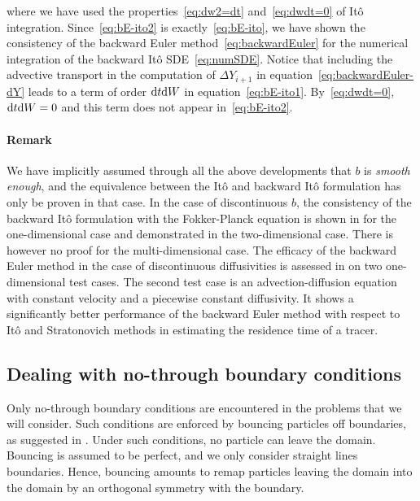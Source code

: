 where we have used the properties~\eqref{eq:dw2=dt} and~\eqref{eq:dwdt=0} of Itô integration. Since~\eqref{eq:bE-ito2} is exactly~\eqref{eq:bE-ito}, we have shown the consistency of the backward Euler method~\eqref{eq:backwardEuler} for the numerical integration of the backward Itô SDE~\eqref{eq:numSDE}. Notice that including the advective transport in the computation of $\Delta Y_{i+1}$ in equation~\eqref{eq:backwardEuler-dY} leads to a term of order $\rm dt \rm dW$ in equation~\eqref{eq:bE-ito1}. By~\eqref{eq:dwdt=0}, $\rm dt \rm dW = 0$ and this term does not appear in~\eqref{eq:bE-ito2}. 

\paragraph{Remark} We have implicitly assumed through all the above developments that $b$ is \textit{smooth enough}, and the equivalence between the Itô and backward Itô formulation has only be proven in that case. In the case of discontinuous $b$, the consistency of the backward Itô formulation with the Fokker-Planck equation is shown in \cite{labolle2000diffusion} for the one-dimensional case and demonstrated in the two-dimensional case. There is however no proof for the multi-dimensional case. The efficacy of the backward Euler method in the case of discontinuous diffusivities is assessed in \cite{spivakovskaya2007backward} on two one-dimensional test cases. The second test case is an advection-diffusion equation with constant velocity and a piecewise constant diffusivity. It shows a significantly better performance of the backward Euler method with respect to Itô and Stratonovich methods in estimating the residence time of a tracer. %

\subsection{Dealing with no-through boundary conditions}
Only no-through boundary conditions are encountered in the problems that we will consider. Such conditions are enforced by bouncing particles off boundaries, as suggested in \cite{tompson1992particle}. Under such conditions, no particle can leave the domain. Bouncing is assumed to be perfect, and we only consider straight lines boundaries. Hence, bouncing amounts to remap particles leaving the domain into the domain by an orthogonal symmetry with the boundary.

